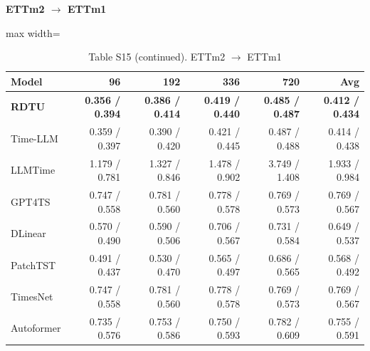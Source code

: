\begin{table}[H]\centering\small
\caption*{Table S15 (continued). ETTm2 $\to$ ETTm1}
\textbf{ETTm2 $\to$ ETTm1}\par\smallskip
\begin{adjustbox}{max width=\linewidth}\begin{tabular}{lrrrrr}\toprule
\textbf{Model} & \textbf{96} & \textbf{192} & \textbf{336} & \textbf{720} & \textbf{Avg}\\\midrule
\rowcolor{blue!5}
\textbf{RDTU} & \textbf{0.356 / 0.394} & \textbf{0.386 / 0.414} & \textbf{0.419 / 0.440} & \textbf{0.485 / 0.487} & \textbf{0.412 / 0.434}\\
Time-LLM & 0.359 / 0.397 & 0.390 / 0.420 & 0.421 / 0.445 & 0.487 / 0.488 & 0.414 / 0.438\\
LLMTime & 1.179 / 0.781 & 1.327 / 0.846 & 1.478 / 0.902 & 3.749 / 1.408 & 1.933 / 0.984\\
GPT4TS & 0.747 / 0.558 & 0.781 / 0.560 & 0.778 / 0.578 & 0.769 / 0.573 & 0.769 / 0.567\\
DLinear & 0.570 / 0.490 & 0.590 / 0.506 & 0.706 / 0.567 & 0.731 / 0.584 & 0.649 / 0.537\\
PatchTST & 0.491 / 0.437 & 0.530 / 0.470 & 0.565 / 0.497 & 0.686 / 0.565 & 0.568 / 0.492\\
TimesNet & 0.747 / 0.558 & 0.781 / 0.560 & 0.778 / 0.578 & 0.769 / 0.573 & 0.769 / 0.567\\
Autoformer & 0.735 / 0.576 & 0.753 / 0.586 & 0.750 / 0.593 & 0.782 / 0.609 & 0.755 / 0.591\\
\bottomrule\end{tabular}\end{adjustbox}\end{table}
